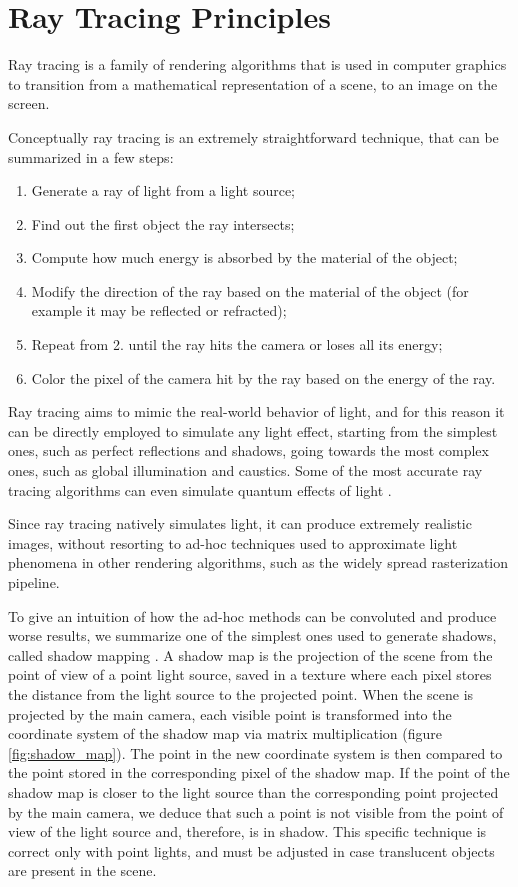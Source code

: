 \documentclass{PoliMi_MasterThesis}
\begin{document}
\section{Ray Tracing Principles} \label{sec:ray_tracing_principles}
Ray tracing is a family of rendering algorithms that is used in computer graphics to transition from a mathematical representation of a scene, to an image on the screen.

Conceptually ray tracing is an extremely straightforward technique, that can be summarized in a few steps:
\begin{enumerate}
\item Generate a ray of light from a light source;
\item Find out the first object the ray intersects;
\item Compute how much energy is absorbed by the material of the object;
\item Modify the direction of the ray based on the material of the object (for example it may be reflected or refracted);
\item Repeat from 2. until the ray hits the camera or loses all its energy;
\item Color the pixel of the camera hit by the ray based on the energy of the ray.
\end{enumerate}

Ray tracing aims to mimic the real-world behavior of light, and for this reason it can be directly employed to simulate any light effect, starting from the simplest ones, such as perfect reflections and shadows, going towards the most complex ones, such as global illumination and caustics. Some of the most accurate ray tracing algorithms can even simulate quantum effects of light \cite{quantum_ray_tracing}.

Since ray tracing natively simulates light, it can produce extremely realistic images, without resorting to ad-hoc techniques used to approximate light phenomena in other rendering algorithms, such as the widely spread rasterization pipeline.

To give an intuition of how the ad-hoc methods can be convoluted and produce worse results, we summarize one of the simplest ones used to generate shadows, called shadow mapping \cite{shadow_maps}. A shadow map is the projection of the scene from the point of view of a point light source, saved in a texture where each pixel stores the distance from the light source to the projected point. When the scene is projected by the main camera, each visible point is transformed into the coordinate system of the shadow map via matrix multiplication (figure \ref{fig:shadow_map}). The point in the new coordinate system is then compared to the point stored in the corresponding pixel of the shadow map. If the point of the shadow map is closer to the light source than the corresponding point projected by the main camera, we deduce that such a point is not visible from the point of view of the light source and, therefore, is in shadow. This specific technique is correct only with point lights, and must be adjusted in case translucent objects are present in the scene.
\end{document}
